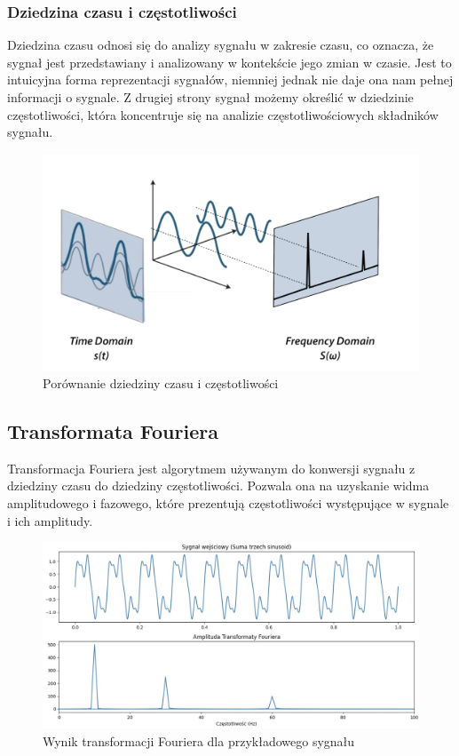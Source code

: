 \subsubsection{Dziedzina czasu i częstotliwości}

Dziedzina czasu odnosi się do analizy sygnału w zakresie czasu, co oznacza, że sygnał jest przedstawiany i analizowany w kontekście jego zmian w czasie. Jest to intuicyjna forma reprezentacji sygnałów, niemniej jednak nie daje ona nam pełnej informacji o sygnale. Z drugiej strony sygnał możemy określić w dziedzinie częstotliwości, która koncentruje się na analizie częstotliwościowych składników sygnału.


\begin{figure}[h]
    \centering
    \includegraphics[width=0.45\linewidth]{Rozdziały/02.Podstawy_teoretyczne/time-frequency-domain.png}
    \caption{Porównanie dziedziny czasu i częstotliwości}
    \label{fig:image22}
\end{figure}



\subsection*{Transformata Fouriera}

Transformacja Fouriera jest algorytmem używanym do konwersji sygnału z dziedziny czasu do dziedziny częstotliwości. Pozwala ona na uzyskanie widma amplitudowego i fazowego, które prezentują częstotliwości występujące w sygnale i ich amplitudy.

\begin{figure}[h]
    \centering
    \includegraphics[width=0.8\linewidth]{Rozdziały/02.Podstawy_teoretyczne/fft.png}
    \caption{Wynik transformacji Fouriera dla przykładowego sygnału}
    \label{fig:image23}
\end{figure}

